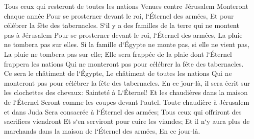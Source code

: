 \verse Tous ceux qui resteront de toutes les nations Venues contre Jérusalem Monteront chaque année Pour se prosterner devant le roi, l`Éternel des armées, Et pour célébrer la fête des tabernacles. 
\verse S`il y a des familles de la terre qui ne montent pas à Jérusalem Pour se prosterner devant le roi, l`Éternel des armées, La pluie ne tombera pas sur elles. 
\verse Si la famille d`Égypte ne monte pas, si elle ne vient pas, La pluie ne tombera pas sur elle; Elle sera frappée de la plaie dont l`Éternel frappera les nations Qui ne monteront pas pour célébrer la fête des tabernacles. 
\verse Ce sera le châtiment de l`Égypte, Le châtiment de toutes les nations Qui ne monteront pas pour célébrer la fête des tabernacles. 
\verse En ce jour-là, il sera écrit sur les clochettes des chevaux: Sainteté à L`Éternel! Et les chaudières dans la maison de l`Éternel Seront comme les coupes devant l`autel. 
\verse Toute chaudière à Jérusalem et dans Juda Sera consacrée à l`Éternel des armées; Tous ceux qui offriront des sacrifices viendront Et s`en serviront pour cuire les viandes; Et il n`y aura plus de marchands dans la maison de l`Éternel des armées, En ce jour-là. 
